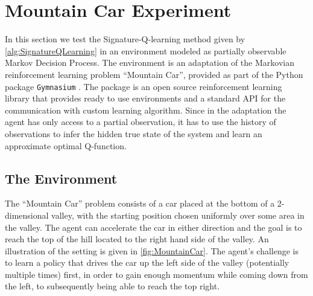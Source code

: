 \documentclass[
    a4paper,
    11pt,
    bibliography=totoc,
    listof=totoc,      
    headinclude=true,
    cleardoublepage=empty,
]{scrbook}
\theoremstyle{plain}
\theoremstyle{definition}
\theoremstyle{remark}
\begin{document}
\section{Mountain Car Experiment}
\label{chapter:Experiments:section:MountainCar}

In this section we test the Signature-Q-learning method given by 
\cref{alg:SignatureQLearning} in an environment modeled as partially
observable Markov Decision Process. The environment is an adaptation of the
Markovian reinforcement learning problem ``Mountain Car'', provided as part of
the Python package \texttt{Gymnasium} \cite{towers2023_gv0}. The package is an
open source reinforcement learning library that provides ready to use
environments and a standard API for the communication with custom learning
algorithm. Since in the adaptation the agent has only access to a partial
observation, it has to use the history of observations to infer the hidden true
state of the system and learn an approximate optimal Q-function.

\subsection{The Environment} 
\label{chapter:Experiments:section:MountainCar:sub:Environment}

The ``Mountain Car'' problem consists of a car placed at the bottom
of a 2-dimensional valley, with the starting position chosen uniformly over
some area in the valley. The agent can accelerate the car in either direction
and the goal is to reach the top of the hill located to the right hand side of
the valley. An illustration of the setting is given in \cref{fig:MountainCar}.
The agent's challenge is to learn a policy that drives the car up the left side
of the valley (potentially multiple times) first, in order to gain enough
momentum while coming down from the left, to subsequently being able to reach
the top right. 
\end{document}
